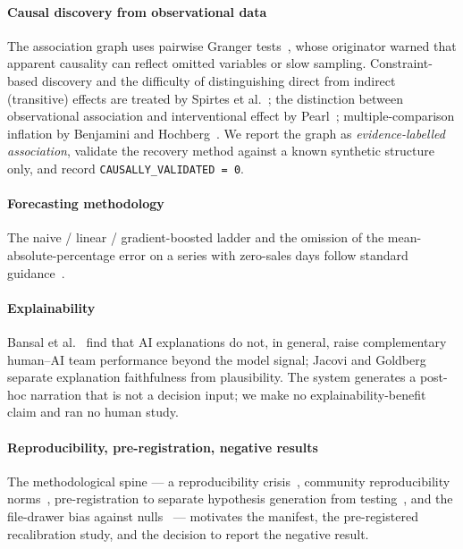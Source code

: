 \documentclass[conference]{IEEEtran}
\newcommand{\code}[1]{\texttt{#1}}
\begin{document}
\paragraph{Causal discovery from observational data}
The association graph uses pairwise Granger tests~\cite{Granger1969}, whose
originator warned that apparent causality can reflect omitted variables or slow
sampling. Constraint-based discovery and the difficulty of distinguishing direct
from indirect (transitive) effects are treated by Spirtes et
al.~\cite{Spirtes2000}; the distinction between observational association and
interventional effect by Pearl~\cite{Pearl2009}; multiple-comparison inflation
by Benjamini and Hochberg~\cite{Benjamini1995}. We report the graph as
\emph{evidence-labelled association}, validate the recovery method against a
known synthetic structure only, and record \code{CAUSALLY\_VALIDATED = 0}.

\paragraph{Forecasting methodology}
The naive / linear / gradient-boosted ladder and the omission of the
mean-absolute-percentage error on a series with zero-sales days follow standard
guidance~\cite{Hyndman2006,Chen2016}.

\paragraph{Explainability}
Bansal et al.~\cite{Bansal2021} find that AI explanations do not, in general,
raise complementary human--AI team performance beyond the model signal; Jacovi
and Goldberg~\cite{Jacovi2020} separate explanation faithfulness from
plausibility. The system generates a post-hoc narration that is not a decision
input; we make no explainability-benefit claim and ran no human study.

\paragraph{Reproducibility, pre-registration, negative results}
The methodological spine --- a reproducibility crisis~\cite{Baker2016}, community
reproducibility norms~\cite{Pineau2021}, pre-registration to separate hypothesis
generation from testing~\cite{Nosek2018}, and the file-drawer bias against
nulls~\cite{Rosenthal1979} --- motivates the manifest, the pre-registered
recalibration study, and the decision to report the negative result.
\end{document}
